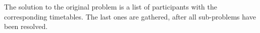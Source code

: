 \documentclass[ThesisDoc]{subfiles}
\begin{document}
  The solution to the original problem is a list of participants with the corresponding
timetables. The last ones are gathered, after all sub-problems have been resolved.


%   
\end{document}
